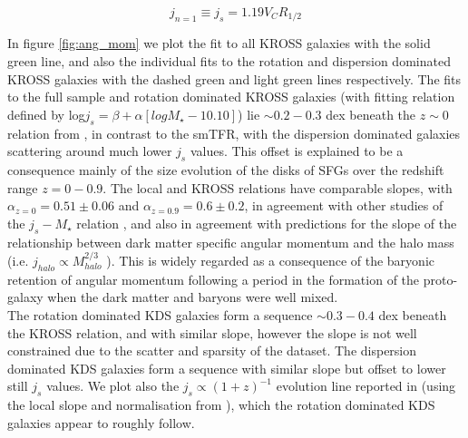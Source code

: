 \documentclass[a4paper,fleqn,usenatbib]{mn2e}
\begin{document}
\begin{equation}\label{eq:ang_mom_final}
   j_{n=1} \equiv j_{s} = 1.19V_{C}R_{1/2}
\end{equation}



In figure \ref{fig:ang_mom} we plot the fit to all KROSS galaxies with the solid green line, and also the individual fits to the rotation and dispersion dominated KROSS galaxies with the dashed green and light green lines respectively.
The fits to the full sample and rotation dominated KROSS galaxies (with fitting relation defined by log$j_{s} =  \beta + \alpha[logM_{\star} - 10.10]$) lie $\sim0.2-0.3$ dex beneath the $z\sim0$ relation from \cite{Romanowsky2012}, in contrast to the smTFR, with the dispersion dominated galaxies scattering around much lower $j_{s}$ values.
This offset is explained to be a consequence mainly of the size evolution of the disks of SFGs over the redshift range $z=0-0.9$.
The local and KROSS relations have comparable slopes, with $\alpha_{z=0}=0.51\pm0.06$ and $\alpha_{z=0.9}=0.6\pm0.2$, in agreement with other studies of the $j_{s}-M_{\star}$ relation \citep{Cortese2016,Contini2015a,Burkert2016a,Swinbank2017}, and also in agreement with predictions for the slope of the relationship between dark matter specific angular momentum and the halo mass (i.e. $j_{halo} \propto M_{halo}^{2/3}$ \citep[e.g.][]{Barnes1987}).
This is widely regarded as a consequence of the baryonic retention of angular momentum following a period in the formation of the proto-galaxy when the dark matter and baryons were well mixed. \\

The rotation dominated KDS galaxies form a sequence $\sim 0.3-0.4$ dex beneath the KROSS relation, and with similar slope, however the slope is not well constrained due to the scatter and sparsity of the dataset.
The dispersion dominated KDS galaxies form a sequence with similar slope but offset to lower still $j_{s}$ values.
We plot also the $j_{s} \propto (1+z)^{-1}$ evolution line reported in \cite{Swinbank2017} (using the local slope and normalisation from \cite{Romanowsky2012}), which the rotation dominated KDS galaxies appear to roughly follow. \\
\end{document}
